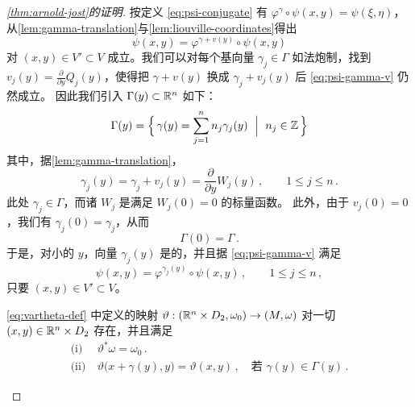 \begin{proof}[\cref*{thm:arnold-jost}的证明]
按定义 \eqref{eq:psi-conjugate} 有 $\varphi^{\gamma}\circ\psi(x,y)=\psi(\xi,\eta)$，%
从\cref{lem:gamma-translation}与\cref{lem:liouville-coordinates}得出
\begin{equation}\label{eq:psi-gamma-v}
\psi(x,y)=\varphi^{\gamma+v(y)}\circ\psi(x,y)
\end{equation}
对 $(x,y)\in V'\subset V$ 成立。我们可以对每个基向量 $\gamma_{j}\in\Gamma$%
如法炮制，找到 $v_{j}(y)=\frac{\partial}{\partial y}Q_{j}(y)$，使得把%
$\gamma+v(y)$ 换成 $\gamma_{j}+v_{j}(y)$ 后 \eqref{eq:psi-gamma-v} 仍然成立。%
因此我们引入\trLattice{} $\Gamma(y)\subset\mathbb{R}^{n}$ 如下：
\begin{equation}\label{eq:lattice-gamma-y}
\Gamma(y)=\Bigl\{\,\gamma(y)=\sum_{j=1}^{n}n_{j}\gamma_{j}(y)\ \Bigm|\ n_{j}\in\mathbb{Z}\,\Bigr\}
\end{equation}
其中，据\cref{lem:gamma-translation}，
\[
\gamma_{j}(y)=\gamma_{j}+v_{j}(y)=\frac{\partial}{\partial y}W_{j}(y)\,,%
\qquad 1\leq j\leq n\,.
\]
此处 $\gamma_{j}\in\Gamma$，而诸 $W_{j}$ 是满足 $W_{j}(0)=0$ 的标量函数。%
此外，由于 $v_{j}(0)=0$，我们有 $\gamma_{j}(0)=\gamma_{j}$，从而
\begin{equation}\label{eq:gamma-zero}
\Gamma(0)=\Gamma\,.
\end{equation}
于是，对小的 $y$，\trLattice{}向量 $\gamma_{j}(y)$ 是\trLinearlyIndependent{}的，并且据%
\eqref{eq:psi-gamma-v} 满足
\begin{equation}\label{eq:psi-gammaj}
\psi(x,y)=\varphi^{\gamma_{j}(y)}\circ\psi(x,y)\,,\qquad 1\leq j\leq n\,,
\end{equation}
只要 $(x,y)\in V'\subset V$。

\begin{lemma}\label{lem:vartheta-global}
\eqref{eq:vartheta-def} 中定义的映射 $\vartheta:(\R^{n}\times D_{2},\omega_{0})%
\to(M,\omega)$ 对一切 $(x,y)\in\mathbb{R}^{n}\times D_{2}$ 存在，并且满足
\[
\begin{array}{ll}
\text{(i)}  &\ \vartheta^{*}\omega=\omega_{0}\,.\\
\text{(ii)} &\ \vartheta\bigl(x+\gamma(y),y\bigr)=\vartheta(x,y)\,,%
\quad \text{若 }\gamma(y)\in\Gamma(y)\,.
\end{array}
\]
\end{lemma}


\end{proof}
